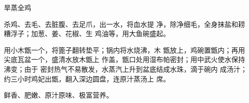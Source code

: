 \begin{recipe}{旱蒸全鸡}

\ingredients


\cooking

\step 杀鸡、去毛、去脏腹、去足爪，出一水，将血水提 净，除净细毛，全身抹盐和耢糟浮子；加葱、姜、花椒、生 鸡油等，用大鱼碗盛起。

\step 用小木甑一个，将篦子翻转垫平；锅内将水烧沸，木 甑放上，鸡碗置甑内；再用尖底瓦盆一个，盛清水放木甑上 作盖，甑口处用湿布帕密封；用中武火使水保持沸变；由于 密封热气不易散发，水蒸汽上升到盆底结成水珠，滴于碗内 成汤汁；约三小时鸡妃出甑，翻入深边圆盘，连原汁蒸汤上 席。

\notes

鲜香、肥嫩、原汁原味、极富营养。

\end{recipe}

